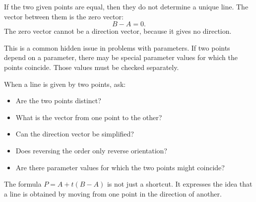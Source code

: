 If the two given points are equal, then they do not determine a unique line. The vector between them is the zero vector:
\[
B-A=0.
\]
The zero vector cannot be a direction vector, because it gives no direction.

This is a common hidden issue in problems with parameters. If two points depend on a parameter, there may be special parameter values for which the points coincide. Those values must be checked separately.

\begin{summarybox}
When a line is given by two points, ask:
\begin{itemize}
\item Are the two points distinct?
\item What is the vector from one point to the other?
\item Can the direction vector be simplified?
\item Does reversing the order only reverse orientation?
\item Are there parameter values for which the two points might coincide?
\end{itemize}
\end{summarybox}

The formula \(P=A+t(B-A)\) is not just a shortcut. It expresses the idea that a line is obtained by moving from one point in the direction of another.